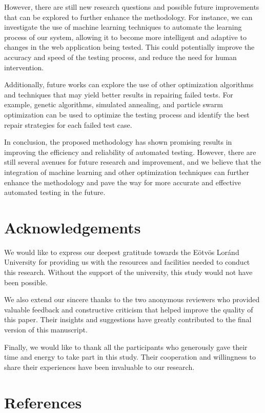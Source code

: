 \documentclass{article}
\begin{document}
However, there are still new research questions and possible future improvements that can be explored to further enhance the methodology. For instance, we can investigate the use of machine learning techniques to automate the learning process of our system, allowing it to become more intelligent and adaptive to changes in the web application being tested. This could potentially improve the accuracy and speed of the testing process, and reduce the need for human intervention.

Additionally, future works can explore the use of other optimization algorithms and techniques that may yield better results in repairing failed tests. For example, genetic algorithms, simulated annealing, and particle swarm optimization can be used to optimize the testing process and identify the best repair strategies for each failed test case.

In conclusion, the proposed methodology has shown promising results in improving the efficiency and reliability of automated testing. However, there are still several avenues for future research and improvement, and we believe that the integration of machine learning and other optimization techniques can further enhance the methodology and pave the way for more accurate and effective automated testing in the future.

\maketitle

\section{Acknowledgements}

We would like to express our deepest gratitude towards the Eötvös Loránd University for providing us with the resources and facilities needed to conduct this research. Without the support of the university, this study would not have been possible.

We also extend our sincere thanks to the two anonymous reviewers who provided valuable feedback and constructive criticism that helped improve the quality of this paper. Their insights and suggestions have greatly contributed to the final version of this manuscript.

Finally, we would like to thank all the participants who generously gave their time and energy to take part in this study. Their cooperation and willingness to share their experiences have been invaluable to our research.

\maketitle

\section{References}

\printbibliography
\end{document}
